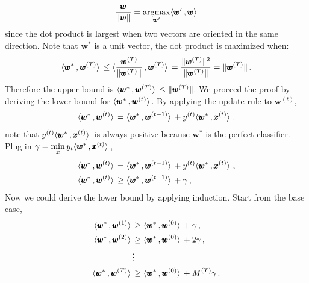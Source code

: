 \documentclass[11pt]{article}
\begin{document}
{\begin{align}
\frac{\pmb{w}}{\| \pmb{w} \|} = \underset{\pmb{w}^{\prime}}{\mathrm{argmax}} \langle  \pmb{w}^{\prime}  \, ,  \pmb{w}  \rangle\,
\end{align}
since the dot product is largest when two vectors are oriented in the same direction. Note that $\pmb{w}^*$ is a unit vector, the dot product is maximized when:
\begin{align}
\langle  \pmb{w}^{*}  \, ,  \pmb{w}^{(T)}  \rangle\, \le \langle \frac{ \pmb{w}^{(T)} }{ \|\pmb{w}^{(T)}  \| } \, ,  \pmb{w}^{(T)}  \rangle\, = \frac{ \| \pmb{w}^{(T)} \|^{2} }{ \| \pmb{w}^{(T)} \| } = \| \pmb{w}^{(T)} \| \, . \label{eq:inter_potential_upper}
\end{align}
Therefore the upper bound is $\langle  \pmb{w}^{*}  \, ,  \pmb{w}^{(T)}  \rangle\, \le \| \pmb{w}^{(T)} \|$. We proceed the proof by deriving the lower bound for $\langle  \pmb{w}^{*}  \, ,  \pmb{w}^{(t)}  \rangle\,$. By applying the update rule to $ \pmb{w}^{(t)} $,
\begin{align}
    \langle  \pmb{w}^{*}  \, ,  \pmb{w}^{(t)}  \rangle\, = \langle  \pmb{w}^{*}  \, ,  \pmb{w}^{(t-1)}  \rangle\, + y^{(t)} \langle \pmb{w}^{*} \, , \pmb{x}^{(t)} \rangle\,\, . \label{eq:12}
\end{align}
note that $y^{(t)} \langle \pmb{w}^{*} \, , \pmb{x}^{(t)} \rangle\,$ is always positive because $\pmb{w}^{*}$ is the perfect classifier. Plug in $\gamma = \underset{x}{\mathrm{min}} \, y_{t} \langle \pmb{w}^{*} \, , \pmb{x}^{(t)} \rangle\,$,
\begin{align}
    \langle  \pmb{w}^{*}  \, ,  \pmb{w}^{(t)}  \rangle\, &= \langle  \pmb{w}^{*}  \, ,  \pmb{w}^{(t-1)}  \rangle\, + y^{(t)} \langle \pmb{w}^{*} \, , \pmb{x}^{(t)} \rangle\,\, , \nonumber \\
        \langle  \pmb{w}^{*}  \, ,  \pmb{w}^{(t)}  \rangle\, &\ge \langle  \pmb{w}^{*}  \, ,  \pmb{w}^{(t-1)}  \rangle\, + \gamma \, ,
\end{align}
Now we could derive the lower bound by applying induction. Start from the base case,
\begin{align}
    \langle  \pmb{w}^{*}  \, ,  \pmb{w}^{(1)}  \rangle\, &\ge \langle  \pmb{w}^{*}  \, ,  \pmb{w}^{(0)}  \rangle\, + \gamma \, , \nonumber \\
    \langle  \pmb{w}^{*}  \, ,  \pmb{w}^{(2)}  \rangle\, &\ge \langle  \pmb{w}^{*}  \, ,  \pmb{w}^{(0)}  \rangle\, + 2 \gamma \, , \nonumber \\
    &\vdots \nonumber \\
    \langle  \pmb{w}^{*}  \, ,  \pmb{w}^{(T)}  \rangle\, &\ge \langle  \pmb{w}^{*}  \, ,  \pmb{w}^{(0)}  \rangle\, + M^{(T)} \gamma \, .
\end{align}
}
\end{document}
